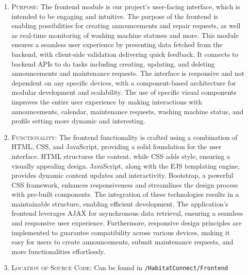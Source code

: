 \documentclass[conference]{IEEEtran}
\begin{document}
\begin{enumerate}
    \item \textsc{Purpose:} The frontend module is our project's user-facing interface, which is intended to be engaging and intuitive. The purpose of the frontend is enabling possibilities for creating announcements and repair requests, as well as real-time monitoring of washing machine statuses and more. This module ensures a seamless user experience by presenting data fetched from the backend, with client-side validation delivering quick feedback. It connects to backend APIs to do tasks including creating, updating, and deleting announcements and maintenance requests. The interface is responsive and not dependent on any specific devices, with a component-based architecture for modular development and scalability. The use of specific visual components improves the entire user experience by making interactions with announcements, calendar, maintenance requests, washing machine status, and profile setting more dynamic and interesting.

    \item \textsc{Functionality:} The frontend functionality is crafted using a combination of HTML, CSS, and JavaScript, providing a solid foundation for the user interface. HTML structures the content, while CSS adds style, ensuring a visually appealing design. JavaScript, along with the EJS templating engine, provides dynamic content updates and interactivity. Bootstrap, a powerful CSS framework, enhances responsiveness and streamlines the design process with pre-built components. The integration of these technologies results in a maintainable structure, enabling efficient development. The application's frontend leverages AJAX for asynchronous data retrieval, ensuring a seamless and responsive user experience. Furthermore, responsive design principles are implemented to guarantee compatibility across various devices, making it easy for users to create announcements, submit maintenance requests, and more functionalities effortlessly.

    \item \textsc{Location of Source Code:} Can be found in \texttt{/HabitatConnect/Frontend}


\end{enumerate}
\end{document}
